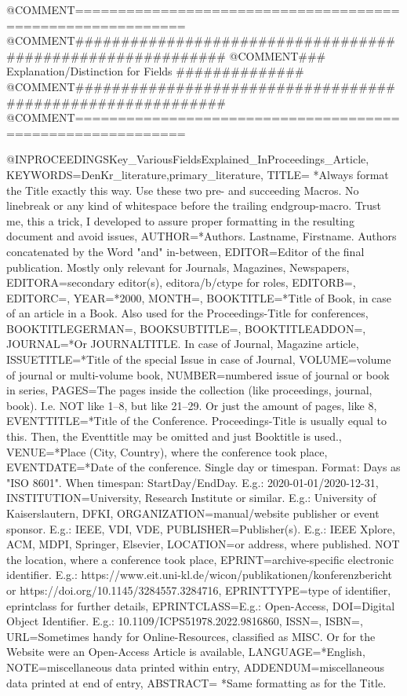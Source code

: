 @COMMENT{===========================================================}
@COMMENT{###########################################################}
@COMMENT{###    Explanation/Distinction for Fields    ##############}
@COMMENT{###########################################################}
@COMMENT{===========================================================}


@INPROCEEDINGS{Key_VariousFieldsExplained_InProceedings_Article,
    KEYWORDS={DenKr_literature,primary_literature},
    TITLE={\begingroup
        *Always format the Title exactly this way. Use these two pre- and succeeding Macros. No linebreak or any kind of whitespace before the trailing endgroup-macro. Trust me, this a trick, I developed to assure proper formatting in the resulting document and avoid issues\endgroup},
    AUTHOR={*Authors. Lastname, Firstname. Authors concatenated by the Word "and" in-between},
    EDITOR={Editor of the final publication. Mostly only relevant for Journals, Magazines, Newspapers},
    EDITORA={secondary editor(s), editora/b/ctype for roles},
    EDITORB={},
    EDITORC={},
    YEAR={*2000},
    MONTH={},
    BOOKTITLE={*Title of Book, in case of an article in a Book. Also used for the Proceedings-Title for conferences},
    BOOKTITLEGERMAN={},
    BOOKSUBTITLE={},
    BOOKTITLEADDON={},
    JOURNAL={*Or JOURNALTITLE. In case of Journal, Magazine article},
    ISSUETITLE={*Title of the special Issue in case of Journal},
    VOLUME={volume of journal or multi-volume book},
    NUMBER={numbered issue of journal or book in series},
    PAGES={The pages inside the collection (like proceedings, journal, book). I.e. NOT like 1--8, but like 21--29. Or just the amount of pages, like 8},
    EVENTTITLE={*Title of the Conference. Proceedings-Title is usually equal to this. Then, the Eventtitle may be omitted and just Booktitle is used.},
    VENUE={*Place (City, Country), where the conference took place},
    EVENTDATE={*Date of the conference. Single day or timespan. Format: Days as "ISO 8601". When timespan: StartDay/EndDay. E.g.: 2020-01-01/2020-12-31},
    INSTITUTION={University, Research Institute or similar. E.g.: University of Kaiserslautern, DFKI},
    ORGANIZATION={manual/website publisher or event sponsor. E.g.: IEEE, VDI, VDE},
    PUBLISHER={Publisher(s). E.g.: IEEE Xplore, ACM, MDPI, Springer, Elsevier},
    LOCATION={or address, where published. NOT the location, where a conference took place},
    EPRINT={archive-specific electronic identifier. E.g.: https://www.eit.uni-kl.de/wicon/publikationen/konferenzbericht   or   https://doi.org/10.1145/3284557.3284716},
    EPRINTTYPE={type of identifier, eprintclass for further details},
    EPRINTCLASS={E.g.: Open-Access},
    DOI={Digital Object Identifier. E.g.: 10.1109/ICPS51978.2022.9816860},
    ISSN={},
    ISBN={},
    URL={Sometimes handy for Online-Resources, classified as MISC. Or for the Website were an Open-Access Article is available},
    LANGUAGE={*English},
    NOTE={miscellaneous data printed within entry},
    ADDENDUM={miscellaneous data printed at end of entry},
    ABSTRACT={\begingroup
        *Same formatting as for the Title.\endgroup}
}
